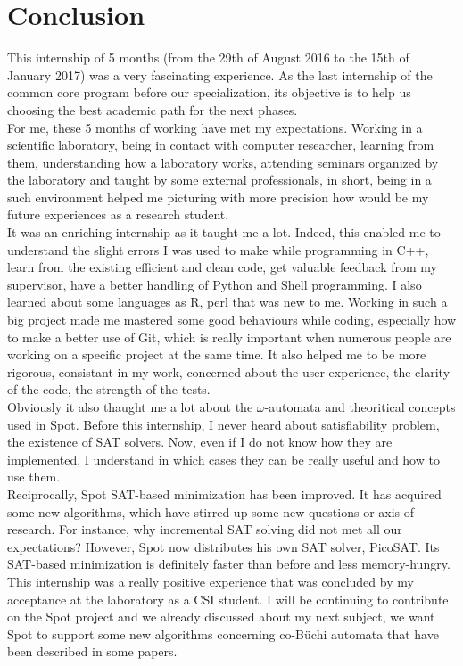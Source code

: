 \chapter{Conclusion}
This internship of 5 months (from the 29th of August 2016 to the 15th of January 2017) was a very
fascinating experience. As the last internship of the common core program before our specialization, its
objective is to help us choosing the best academic path for the next phases.\\

For me, these 5 months of working have met my expectations. Working in a scientific laboratory,
being in contact with computer researcher, learning from them, understanding how a laboratory works,
attending seminars organized by the laboratory and taught by some external professionals, in short, being
in a such environment helped me picturing with more precision how would be my future experiences as
a research student.\\

It was an enriching internship as it taught me a lot. Indeed, this enabled me to understand the slight
errors I was used to make while programming in C++, learn from the existing efficient and clean code,
get valuable feedback from my supervisor, have a better handling of Python and Shell programming.
I also learned about some languages as R, perl that was new to me. Working in such a big project made me
mastered some good behaviours while coding, especially how to make a better use of Git, which is really
important when numerous people are working on a specific project at the same time. It also helped me to be
more rigorous, consistant in my work, concerned about the user experience, the clarity of the code, the strength of
the tests.\\

Obviously it also thaught me a lot about the $\omega$-automata and theoritical concepts used in Spot.
Before this internship, I never heard about satisfiability problem, the existence of SAT solvers. Now,
even if I do not know how they are implemented, I understand in which cases they can be really useful and
how to use them.\\

Reciprocally, Spot SAT-based minimization has been improved. It has acquired some new algorithms, which
have stirred up some new questions or axis of research. For instance, why incremental SAT solving did not
met all our expectations? However, Spot now distributes his own SAT solver, PicoSAT. Its SAT-based
minimization is definitely faster than before and less memory-hungry.\\

This internship was a really positive experience that was concluded by my acceptance at the laboratory
as a CSI student. I will be continuing to contribute on the Spot project and we already discussed about my
next subject, we want Spot to support some new algorithms concerning co-Büchi automata that have been
described in some papers.